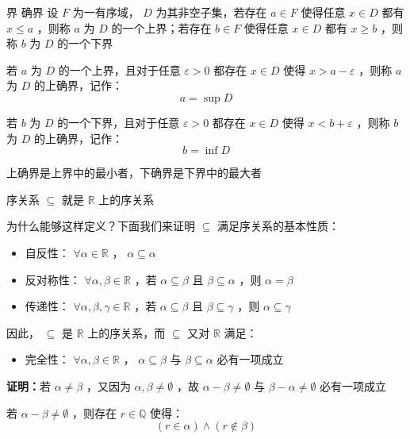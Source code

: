 \begin{definition}{界 确界}
设 $F$ 为一有序域， $D$ 为其非空子集，若存在 $a\in  F$ 使得任意 $x\in D$ 都有 $x\leq a$ ，则称 $a$ 为 $D$ 的一个上界；若存在 $b\in  F$ 使得任意 $x\in D$ 都有 $x\geq b$ ，则称 $b$ 为 $D$ 的一个下界

若 $a$ 为 $D$ 的一个上界，且对于任意 $\varepsilon>0$ 都存在 $x\in D$ 使得 $x>a-\varepsilon$ ，则称 $a$ 为 $D$ 的上确界，记作：
$$a=\sup D$$ 

若 $b$ 为 $D$ 的一个下界，且对于任意 $\varepsilon>0$ 都存在 $x\in D$ 使得 $x<b+\varepsilon$ ，则称 $b$ 为 $D$ 的上确界，记作：
 $$b=\inf D$$ 
\end{definition}
\begin{lemma}{}
上确界是上界中的最小者，下确界是下界中的最大者
\end{lemma}

\begin{definition}{序关系}
$\subseteq$ 就是 $\mathbb{R}$ 上的序关系
\end{definition}
为什么能够这样定义？下面我们来证明 $\subseteq$  满足序关系的基本性质：
\begin{itemize}
\item 自反性： $\forall \alpha\in\mathbb{R}$ ， $\alpha\subseteq\alpha$
\end{itemize}
\begin{itemize}
\item 
反对称性： $\forall \alpha,\beta\in\mathbb{R}$ ，若 $\alpha\subseteq\beta$ 且 $\beta\subseteq\alpha$ ，则 $\alpha=\beta$ 
\end{itemize}
\begin{itemize}
\item 传递性： $\forall \alpha,\beta,\gamma \in \mathbb{R}$ ，若 $\alpha\subseteq\beta$ 且 $\beta\subseteq\gamma$ ，则 $\alpha\subseteq\gamma$ 
\end{itemize}

因此， $\subseteq$ 是 $\mathbb{R}$ 上的序关系，而 $\subseteq$ 又对 $\mathbb{R}$ 满足：

\begin{itemize}
\item 完全性： $\forall \alpha,\beta \in\mathbb{R}$ ， $\alpha\subseteq \beta$  与 $\beta\subseteq \alpha$  必有一项成立
\end{itemize}

\textbf{证明：}若 $\alpha\neq\beta$ ，又因为 $\alpha,\beta\neq\emptyset$ ，故 $\alpha-\beta\neq \emptyset$ 与 $\beta-\alpha \neq \emptyset$ 必有一项成立

若 $\alpha-\beta\neq\emptyset$ ，则存在 $r\in\mathbb{Q}$ 使得：
$$(r\in\alpha)\wedge (r\notin\beta)$$

